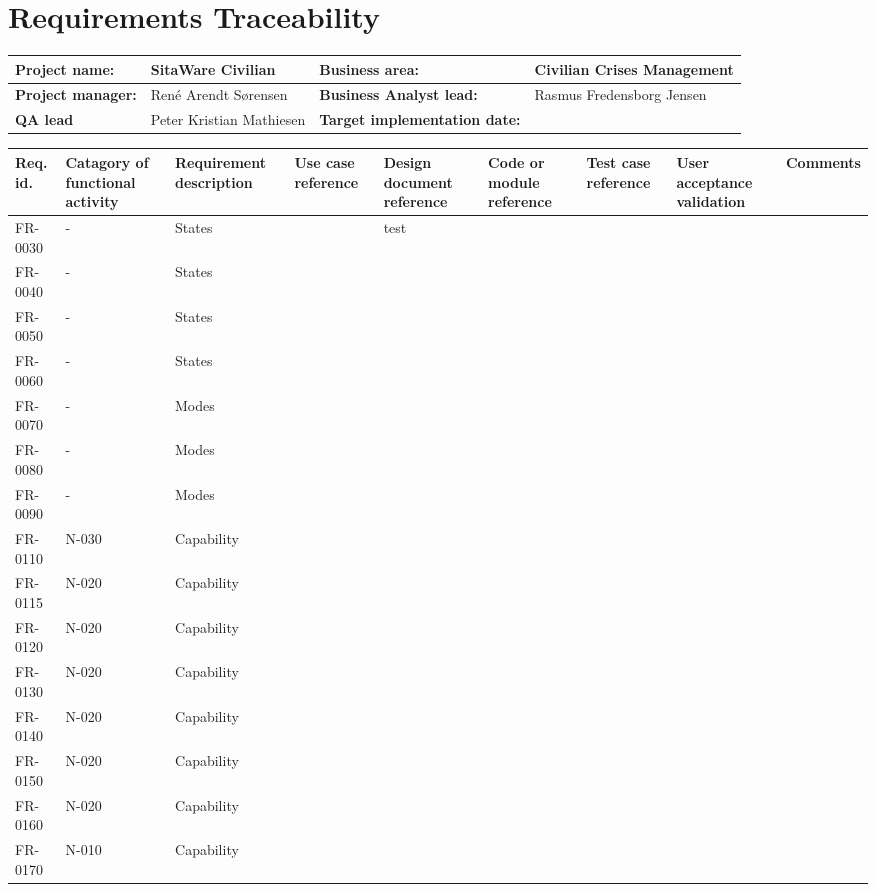 \chapter{Requirements Traceability}

\begin{sidewaystable}
\begin{table}[H]
\begin{tabular}{|l|l|l|l|}
\hline
 \textbf{Project name:} & SitaWare Civilian & \textbf{Business area:}  & Civilian Crises Management\\ \hline
 \textbf{Project manager:} & René Arendt Sørensen & \textbf{Business Analyst lead:} & Rasmus Fredensborg  Jensen\\ \hline
 \textbf{QA lead} & Peter Kristian Mathiesen & \textbf{Target implementation date:}  & \\ \hline
\end{tabular}	
\begin{tabular}{|p{2cm}|p{2cm}|p{3cm}|p{2cm}|p{2cm}|p{2cm}|p{2cm}|p{2cm}|p{2cm}|}
\hline
 Req. id. & Catagory of functional activity & Requirement description  & Use case reference & Design document reference & Code or module reference & Test case reference & User acceptance validation & Comments\\ \hline
 FR-0030 & - & States & & test & & & &\\ \hline 
FR-0040 & - & States & & & & & &\\ \hline  
FR-0050 & - & States & & & & & &\\ \hline  
FR-0060 & - & States & & & & & &\\ \hline  
FR-0070 & - & Modes & & & & & &\\ \hline  
FR-0080 & - & Modes & & & & & &\\ \hline 
FR-0090 & - & Modes & & & & & &\\ \hline 
 FR-0110 & N-030 & Capability & & & & & &\\ \hline
 FR-0115 & N-020 & Capability & & & & & &\\ \hline
 FR-0120 & N-020 & Capability & & & & & &\\ \hline
 FR-0130 & N-020 & Capability & & & & & &\\ \hline
 FR-0140 & N-020 & Capability & & & & & &\\ \hline
 FR-0150 & N-020 & Capability & & & & & &\\ \hline
 FR-0160 & N-020 & Capability & & & & & &\\ \hline
 FR-0170 & N-010 & Capability & & & & & &\\ \hline

\end{tabular}
\end{table}
\end{sidewaystable}
